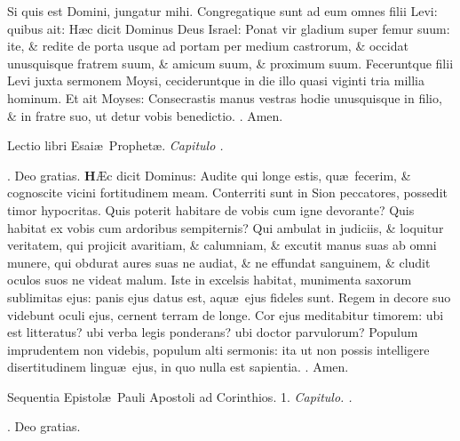 \documentclass[letter,11pt]{book}
\makeatletter
\DeclareRobustCommand{\Rbar}{\vers@resp{0pt}{R}}
\newcommand{\vers@resp@sym}{\raisebox{0.2ex}{\rotatebox[origin=c]{-20}{$\m@th\rceil$}}}
\newcommand{\vers@resp}[2]{%
  {\ooalign{\hidewidth\kern#1\vers@resp@sym\hidewidth\cr#2\cr}}%
}%
\def\R{\color{Red} \Rbar . \color{black}}
\makeatother
\begin{document}
\begin{multicols*}{2}
Si quis est Domini, jungatur mihi. Congregatique sunt ad eum omnes filii Levi: quibus ait: H\ae c dicit Dominus Deus
Israel: Ponat vir gladium super femur suum: ite, \& redite de porta usque ad portam per medium castrorum, \& occidat unusquisque fratrem suum, \& amicum suum, \& proximum suum. Feceruntque filii Levi juxta sermonem Moysi, cecideruntque in die illo quasi viginti tria millia hominum. Et ait Moyses: Consecrastis manus vestras hodie unusquisque in filio, \& in fratre suo, ut detur vobis benedictio. \R Amen.
\vspace{-.5em} \begin{center} {\color{Red} L}ectio libri Esai\ae \ Prophet\ae . \itshape Capitulo . \color{black} \end{center} \vspace{-.5em}
\par \noindent \R Deo gratias.
\lettrine[lines=2]{\bfseries \color{Red} H}{}\AE c dicit Dominus: Audite qui longe estis, qu\ae \ fecerim, \& cognoscite vicini fortitudinem meam. Conterriti sunt in Sion peccatores, possedit timor hypocritas. Quis poterit habitare de vobis cum igne devorante? Quis habitat ex vobis cum ardoribus sempiternis? Qui ambulat in judiciis, \& loquitur veritatem, qui projicit avaritiam, \& calumniam, \& excutit manus suas ab omni munere, qui obdurat aures suas ne audiat, \& ne effundat sanguinem, \& cludit oculos suos ne videat malum. Iste in excelsis habitat, munimenta saxorum sublimitas ejus: panis ejus datus est, aqu\ae \ ejus fideles sunt. Regem in decore suo videbunt oculi ejus, cernent terram de longe. Cor ejus meditabitur timorem: ubi est litteratus? ubi verba legis ponderans? ubi doctor parvulorum? Populum imprudentem non videbis, populum alti sermonis: ita ut non possis intelligere disertitudinem lingu\ae \ ejus, in quo nulla est sapientia. \R Amen.
\vspace{-.5em} \begin{center} {\color{Red} S}equentia Epistol\ae \ Pauli Apostoli ad Corinthios. 1. \itshape Capitulo. . \color{black} \end{center} \vspace{-.5em}
\par \noindent \R Deo gratias.

\end{multicols*}
\end{document}
